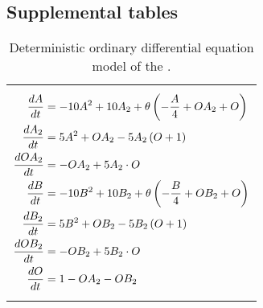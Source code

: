 %
%
%
%

\continuesupplemental

\subsection{Supplemental tables}
\begin{table}[h]
    \caption[Deterministic ordinary differential equation model of the \gtsabbrev{}]{\label{tab:gts_odes}Deterministic ordinary differential equation model of the \gtsabbrev{}.}
    \begin{tabularx}{\textwidth}{Z}
        \hline\hline
         \\
        \hline
        {\begin{align*}
            \frac{dA}{dt}   &= -10 A^2 + 10 A_2 + \theta \left( -\frac{A}{4} + OA_2 + O \right) \\
            \frac{dA_2}{dt}  &= 5 A^2 + OA_2 - 5 A_2 \left( O + 1 \right)                            \\
            \frac{dOA_2}{dt} &= -OA_2 + 5 A_2 \cdot O                                                    \\
            \frac{dB}{dt}   &= -10 B^2 + 10 B_2 + \theta \left( -\frac{B}{4} + OB_2 + O \right) \\
            \frac{dB_2}{dt}  &= 5 B^2 + OB_2 - 5 B_2 \left( O + 1 \right)                            \\
            \frac{dOB_2}{dt} &= -OB_2 + 5 B_2 \cdot O                                                    \\
            \frac{dO}{dt}   &= 1 - OA_2 - OB_2
        \end{align*}} \\
        \hline\hline
    \end{tabularx}
\end{table}
\clearpage

%
